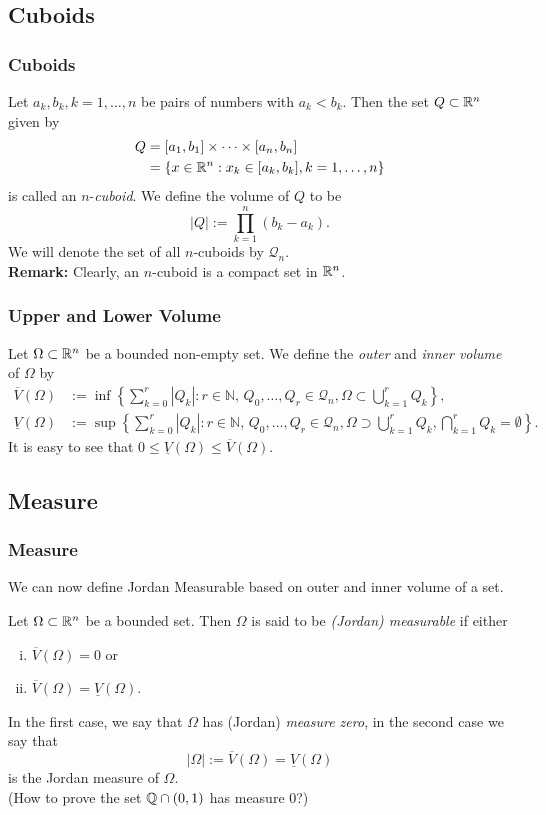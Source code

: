 \documentclass[12pt, t]{beamer}
\renewcommand{\emph}[1]{{\color{Turquoise3}\textsl{#1}}}
\newcommand{\N}{\mathbb{N}}
\newcommand{\nullspace}{~\\[15pt]}
\newcommand{\Remark}{\textbf{Remark: }}
\begin{document}
\subsection{Cuboids}
\begin{frame}
    \frametitle{Cuboids}
    Let $a_k,b_k,k=1,\ldots,n$ be pairs of numbers with $a_k<b_k$. Then the set $Q\subset\mathbb{R}^n$ given by
    \begin{equation*}
        \begin{split}
            Q &=[a_1,b_1]\times\cdots\times[a_n,b_n] \\
            &=\{x\in\mathbb{R}^n:x_k\in[a_k,b_k],k=1,\ldots,n\}
        \end{split}
    \end{equation*}
    is called an $n$-\emph{cuboid}. We define the volume of $Q$ to be
    \[|Q|:=\prod_{k=1}^{n}(b_k-a_k).\]
    We will denote the set of all $n$-cuboids by $\mathcal{Q}_n$.\\[5pt]
    \Remark Clearly, an $n$-cuboid is a compact set in $\mathbb{R}^n$.
\end{frame}

\begin{frame}
    \frametitle{Upper and Lower Volume}
    Let $\Omega\subset\mathbb{R}^n$ be a bounded non-empty set. We define the \emph{outer} and \emph{inner volume} of $\Omega$ by
    \small
    \begin{align*}
        \overline{V}(\Omega)  & :=\inf\left\{\sum_{k=0}^{r}|Q_k|:r\in\N,\,
        Q_0,\ldots,Q_r\in\mathcal{Q}_n,\Omega\subset
        \bigcup\limits_{k=1}^rQ_k\right\},                                 \\
        \underline{V}(\Omega) & :=\sup\left\{\sum_{k=0}^{r}|Q_k|:r\in\N,\,
        Q_0,\ldots,Q_r\in\mathcal{Q}_n,\Omega\supset
        \bigcup\limits_{k=1}^rQ_k,\bigcap\limits_{k=1}^rQ_k
        =\emptyset\right\}.
    \end{align*}
    It is easy to see that $0\leq\underline{V}(\Omega)\leq\overline{V}(\Omega)$.
\end{frame}

\subsection{Measure}
\begin{frame}
    \frametitle{Measure}
    We can now define Jordan Measurable based on outer and inner volume of a set.

    Let $\Omega\subset\mathbb{R}^n$ be a bounded set. Then $\Omega$ is said to be \emph{(Jordan) measurable} if either
    \begin{enumerate}[(i)]
        \item $\overline{V}(\Omega)=0$ or
        \item $\overline{V}(\Omega)=\underline{V}
                  (\Omega)$.
    \end{enumerate}
    In the first case, we say that $\Omega$ has (Jordan) \emph{measure zero}, in the second case we say that
    \[|\Omega|:=\overline{V}(\Omega)=\underline{V}
        (\Omega)\]
    is the Jordan measure of $\Omega$.
    \nullspace\pause
    (How to prove the set $\mathbb{Q}\cap (0,1)$ has measure 0?)
\end{frame}
\end{document}
